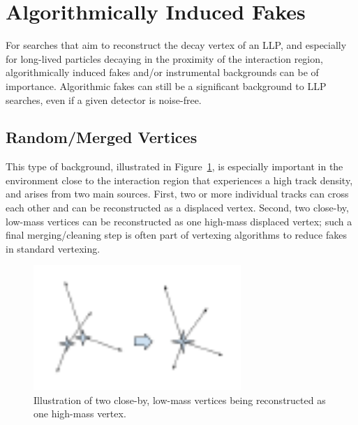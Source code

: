 \section{Algorithmically Induced Fakes} %

For searches that aim to reconstruct the decay vertex of an LLP, and especially for long-lived particles decaying in the proximity of the interaction region, algorithmically induced fakes and/or instrumental backgrounds can be of importance. Algorithmic fakes can still be a significant background to LLP searches, even if a given detector is noise-free.

\subsection{Random/Merged Vertices} %

This type of background, illustrated in Figure~\ref{fig:mergedvertices}, is especially important in the environment close to the interaction region that experiences a high track density, and arises from two main sources. First, two or more individual tracks can cross each other and can be reconstructed as a displaced vertex. Second, two close-by, low-mass vertices can be reconstructed as one high-mass displaced vertex; such a final merging/cleaning step is often part of vertexing algorithms to reduce fakes in standard vertexing.

\begin{figure}[h]
  \centering
  \includegraphics[width=0.7\textwidth]{figures/mergedvertices.pdf}
  \caption{Illustration of two close-by, low-mass vertices being reconstructed as one high-mass vertex.}
  \label{fig:mergedvertices}
\end{figure}


